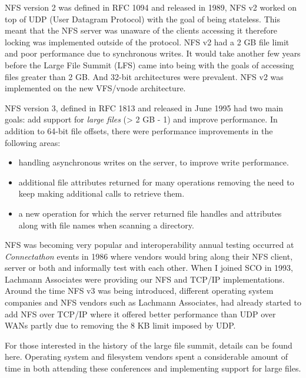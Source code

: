 \noindent
NFS version 2 was defined in RFC 1094 and released in 1989, NFS v2 worked on top of UDP (User  Datagram Protocol) with the goal of being stateless. This meant that the NFS server was unaware of the clients accessing it therefore locking was implemented outside of the protocol. NFS v2 had a 2 GB file limit and poor performance due to synchronous writes. It would take  another few years before the Large File Summit (LFS) came into being with the goals of accessing files greater  than 2 GB. And 32-bit architectures were prevalent. NFS v2 was implemented on the new VFS/vnode architecture.

NFS version 3, defined in RFC 1813 and released in June 1995 had two main goals: add support for \textit{large files} (> 2 GB - 1) and improve performance. In addition to 64-bit file offsets, there were performance improvements in the following areas:

\begin{itemize}
	\item handling asynchronous writes on the server, to improve write performance.
	\item additional file attributes returned for many operations removing the need to keep making additional calls to retrieve them.
	\item a new  operation for which the server returned file handles and attributes along with file 
		names when scanning a directory.
\end{itemize}

\noindent
NFS was becoming very popular and interoperability annual testing occurred at \textit{Connectathon} events in 1986 where vendors would bring along their NFS client, server or both and informally test with each other. When I joined SCO in 1993, Lachmann Associates were providing our NFS and TCP/IP implementations. Around the time NFS v3 was being introduced, different operating system companies and NFS vendors such as Lachmann Associates, had already started to add NFS over TCP/IP where it offered better performance than UDP over WANs partly due to removing the 8 KB limit imposed by UDP.

For those interested in the history of the large file summit, details can be found here. Operating system and filesystem vendors spent a considerable amount of time in both attending these conferences and implementing support for large files.

